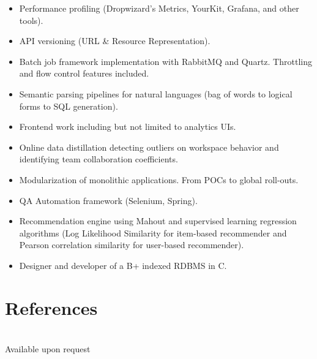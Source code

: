 \documentclass{article}
\begin{document}
\begin{multicols}{2}
\begin{itemize}
				\item Performance profiling (Dropwizard’s Metrics, YourKit, Grafana, and other tools).
				\item API versioning (URL \& Resource Representation).
				\item Batch job framework implementation with RabbitMQ and Quartz. Throttling and flow control features included.
				\item Semantic parsing pipelines for natural languages (bag of words to logical forms to SQL generation).
				\item Frontend work including but not limited to analytics UIs.
				\item Online data distillation detecting outliers on workspace behavior and identifying team collaboration coefficients.
				\item Modularization of monolithic applications. From POCs to global roll-outs.
				\item QA Automation framework (Selenium, Spring).
				\item Recommendation engine using Mahout and supervised learning regression algorithms (Log Likelihood Similarity for item-based recommender and Pearson correlation similarity for user-based recommender).
				\item Designer and developer of a B+ indexed RDBMS in C.
			\end{itemize}
	\end{multicols}

	\section*{\color{NavyBlue}References}
	\vspace{-0.5cm}
	{\color{NavyBlue}\hrulefill} \\
	Available upon request
\end{document}
